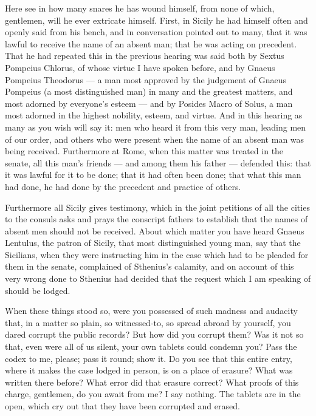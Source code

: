  Here see in how many snares he has wound himself, from none of which, gentlemen, will he ever extricate himself. First, in Sicily he had himself often and openly said from his bench, and in conversation pointed out to many, that it was lawful to receive the name of an absent man; that he was acting on precedent. That he had repeated this in the previous hearing was said both by Sextus Pompeius Chlorus, of whose virtue I have spoken before, and by Gnaeus Pompeius Theodorus --- a man most approved by the judgement of Gnaeus Pompeius (a most distinguished man) in many and the greatest matters, and most adorned by everyone's esteem --- and by Posides Macro of Solus, a man most adorned in the highest nobility, esteem, and virtue. And in this hearing as many as you wish will say it: men who heard it from this very man, leading men of our order, and others who were present when the name of an absent man was being received. Furthermore at Rome, when this matter was treated in the senate, all this man's friends --- and among them his father --- defended this: that it was lawful for it to be done; that it had often been done; that what this man had done, he had done by the precedent and practice of others.

 Furthermore all Sicily gives testimony, which in the joint petitions of all the cities to the consuls asks and prays the conscript fathers to establish that the names of absent men should not be received. About which matter you have heard Gnaeus Lentulus, the patron of Sicily, that most distinguished young man, say that the Sicilians, when they were instructing him in the case which had to be pleaded for them in the senate, complained of Sthenius's calamity, and on account of this very wrong done to Sthenius had decided that the request which I am speaking of should be lodged.

 When these things stood so, were you possessed of such madness and audacity that, in a matter so plain, so witnessed-to, so spread abroad by yourself, you dared corrupt the public records? But how did you corrupt them? Was it not so that, even were all of us silent, your own tablets could condemn you? Pass the codex to me, please; pass it round; show it. Do you see that this entire entry, where it makes the case lodged in person, is on a place of erasure? What was written there before? What error did that erasure correct? What proofs of this charge, gentlemen, do you await from me? I say nothing. The tablets are in the open, which cry out that they have been corrupted and erased.

